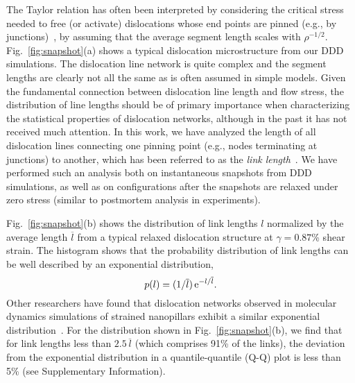 \documentclass[%
reprint,
 amsmath,amssymb,
 aps,
superscriptaddress,
]{revtex4-1}
\begin{document}
%
The Taylor relation has often been interpreted by considering the critical
stress needed to free (or activate) dislocations whose end points are pinned
(e.g., by junctions)~\cite{Saada1960}, by assuming that the average segment length 
scales with $\rho^{-1/2}$.
%
Fig.~\ref{fig:snapshot}(a) shows a typical dislocation microstructure from our
DDD simulations. The dislocation line network is quite complex and the 
segment lengths are clearly not all the same as is often assumed in simple
models. 
% 
Given the fundamental connection between dislocation line length and flow
stress, the distribution of line lengths should be of primary importance when
characterizing the statistical properties of dislocation networks, although in
the past it has not received much attention.
%
%
%
In this work, we have analyzed the length of all dislocation lines connecting 
one pinning point (e.g., nodes terminating at junctions) to another, which has 
been referred to as the \emph{link length}~\cite{Bilde-Sorensen1973}.
%
We have performed such an analysis both on instantaneous snapshots from DDD
simulations, as well as on configurations after the snapshots are relaxed under
zero stress (similar to postmortem analysis in experiments). 


Fig.~\ref{fig:snapshot}(b) shows the distribution of link lengths $l$
normalized by the average length $\overline{l}$ from a typical relaxed 
dislocation structure at $\gamma = 0.87$\% shear strain.
%
The histogram shows that the probability distribution of link lengths can be 
well described by an exponential distribution,
%
\begin{equation}
  p(l) = (1 /\overline{l} ) \, {\rm e}^{-l / \overline{l} }.  \label{eq:plexp}
\end{equation}
%
Other researchers have found that dislocation networks observed in
molecular dynamics simulations of strained nanopillars
exhibit a similar exponential distribution~\cite{Voyiadjis2017}.
%
For the distribution shown in Fig.~\ref{fig:snapshot}(b), we find that for link
lengths less than $2.5\,\overline{l}$ (which comprises 91\% of the links), the
deviation from the exponential distribution in a quantile-quantile (Q-Q) plot is
less than 5\% (see Supplementary Information).
%
\end{document}
